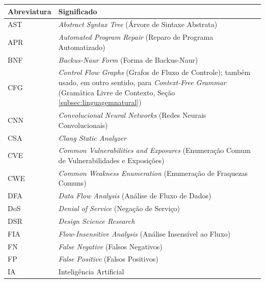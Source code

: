 \documentclass[
    12pt,                %
    openright,           %
    oneside,             %
    a4paper,             %
    english,             %
    brazil               %
]{abntex2}
\begin{document}
\vspace{\onelineskip}
\begin{center}
\begin{tabular}{@{}p{3.2cm}p{}@{}}
\toprule
\textbf{Abreviatura} & \textbf{Significado} \\
\midrule
AST  & \textit{Abstract Syntax Tree} (Árvore de Sintaxe Abstrata) \\
APR  & \textit{Automated Program Repair} (Reparo de Programa Automatizado) \\
BNF  & \textit{Backus-Naur Form} (Forma de Backus-Naur) \\
CFG  & \textit{Control Flow Graphs} (Grafos de Fluxo de Controle); também usado, em outro sentido, para \textit{Context-Free Grammar} (Gramática Livre de Contexto, Seção \ref{subsec:linguagemnatural}) \\
CNN  & \textit{Convolucional Neural Networks} (Redes Neurais Convolucionais) \\
CSA  & \textit{Clang Static Analyzer} \\
CVE  & \textit{Common Vulnerabilities and Exposures} (Enumeração Comum de Vulnerabilidades e Exposições)  \\
CWE  & \textit{Common Weakness Enumeration} (Enumeração de Fraquezas Comuns) \\
DFA  & \textit{Data Flow Analysis} (Análise de Fluxo de Dados) \\
DoS  & \textit{Denial of Service} (Negação de Serviço) \\
DSR  & \textit{Design Science Research} \\
FIA  & \textit{Flow-Insensitive Analysis} (Análise Insensível ao Fluxo) \\
FN   & \textit{False Negative} (Falsos Negativos) \\
FP   & \textit{False Positive} (Falsos Positivos) \\
IA   & Inteligência Artificial \\
\bottomrule
\end{tabular}
\end{center}
\end{document}
